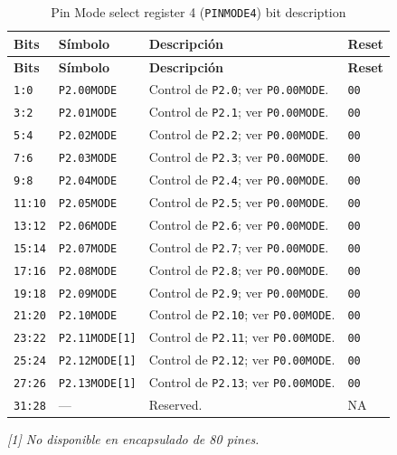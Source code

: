 \begin{longtable}{|>{\raggedright\arraybackslash}p{}|>{\raggedright\arraybackslash}p{}|>{\raggedright\arraybackslash}p{}|>{\centering\arraybackslash}p{}|}
\caption{Pin Mode select register 4 (\texttt{PINMODE4}) bit description}\\
\hline
\textbf{Bits} & \textbf{Símbolo} & \textbf{Descripción} & \textbf{Reset} \\
\hline
\endfirsthead
\hline
\textbf{Bits} & \textbf{Símbolo} & \textbf{Descripción} & \textbf{Reset} \\
\hline
\endhead
\texttt{1:0} & \texttt{P2.00MODE} & Control de \texttt{P2.0}; ver \texttt{P0.00MODE}. & \texttt{00} \\
\hline
\texttt{3:2} & \texttt{P2.01MODE} & Control de \texttt{P2.1}; ver \texttt{P0.00MODE}. & \texttt{00} \\
\hline
\texttt{5:4} & \texttt{P2.02MODE} & Control de \texttt{P2.2}; ver \texttt{P0.00MODE}. & \texttt{00} \\
\hline
\texttt{7:6} & \texttt{P2.03MODE} & Control de \texttt{P2.3}; ver \texttt{P0.00MODE}. & \texttt{00} \\
\hline
\texttt{9:8} & \texttt{P2.04MODE} & Control de \texttt{P2.4}; ver \texttt{P0.00MODE}. & \texttt{00} \\
\hline
\texttt{11:10} & \texttt{P2.05MODE} & Control de \texttt{P2.5}; ver \texttt{P0.00MODE}. & \texttt{00} \\
\hline
\texttt{13:12} & \texttt{P2.06MODE} & Control de \texttt{P2.6}; ver \texttt{P0.00MODE}. & \texttt{00} \\
\hline
\texttt{15:14} & \texttt{P2.07MODE} & Control de \texttt{P2.7}; ver \texttt{P0.00MODE}. & \texttt{00} \\
\hline
\texttt{17:16} & \texttt{P2.08MODE} & Control de \texttt{P2.8}; ver \texttt{P0.00MODE}. & \texttt{00} \\
\hline
\texttt{19:18} & \texttt{P2.09MODE} & Control de \texttt{P2.9}; ver \texttt{P0.00MODE}. & \texttt{00} \\
\hline
\texttt{21:20} & \texttt{P2.10MODE} & Control de \texttt{P2.10}; ver \texttt{P0.00MODE}. & \texttt{00} \\
\hline
\texttt{23:22} & \texttt{P2.11MODE[1]} & Control de \texttt{P2.11}; ver \texttt{P0.00MODE}. & \texttt{00} \\
\hline
\texttt{25:24} & \texttt{P2.12MODE[1]} & Control de \texttt{P2.12}; ver \texttt{P0.00MODE}. & \texttt{00} \\
\hline
\texttt{27:26} & \texttt{P2.13MODE[1]} & Control de \texttt{P2.13}; ver \texttt{P0.00MODE}. & \texttt{00} \\
\hline
\texttt{31:28} & --- & Reserved. & NA \\
\hline
\end{longtable}
\noindent\textit{[1] No disponible en encapsulado de 80 pines.}

